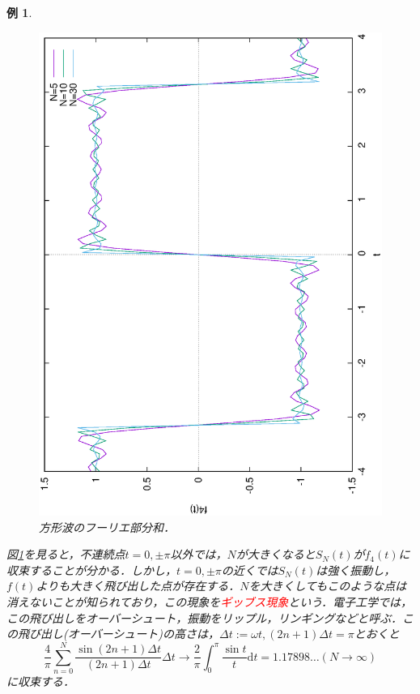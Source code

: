 \documentclass[a4j]{jsbook}
\newtheorem{example}[theorem]{例}
\numberwithin{theorem}{chapter}  %
\begin{document}
\begin{example}
\begin{figure}[htbp]
    \includegraphics[angle=-90, width=\linewidth]{A3-1.eps}
    \caption{方形波のフーリエ部分和．}
    \label{fig1-6}
\end{figure}
図\ref{fig1-6}を見ると，不連続点\(t=0, \pm\pi\)以外では，\(N\)が大きくなると\(S_N(t)\)が\(f_4(t)\)に収束することが分かる．しかし，\(t=0, \pm\pi\)の近くでは\(S_N(t)\)は強く振動し，\(f(t)\)よりも大きく飛び出した点が存在する．\(N\)を大きくしてもこのような点は消えないことが知られており，この現象を\textcolor{red}{ギッブス現象}という．電子工学では，この飛び出しをオーバーシュート，振動をリップル，リンギングなどと呼ぶ．この飛び出し(オーバーシュート)の高さは，\(\Delta t:=\omega t, (2n+1)\Delta t=\pi\)とおくと
\begin{equation*}
    \frac{4}{\pi}\sum_{n=0}^N \frac{\sin(2n+1)\Delta t}{(2n+1)\Delta t}\Delta t\to\frac{2}{\pi}\int_0^\pi \frac{\sin t}{t}\mathrm{d}t=1.17898\dots (N\to\infty)
\end{equation*}
に収束する．
\end{example}
\end{document}
